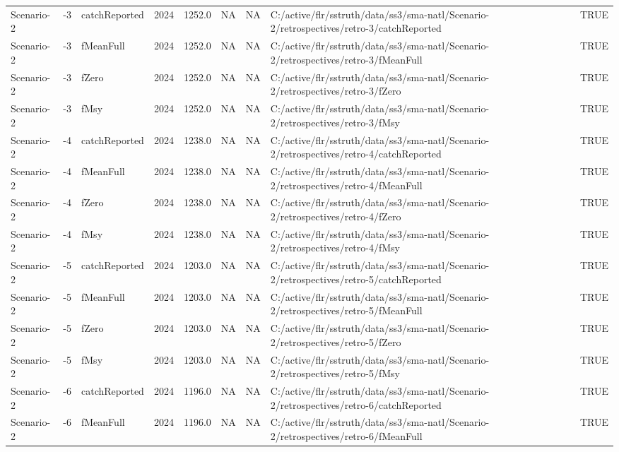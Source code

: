 \begin{table}
\begin{tabular}[t]{lllrrrrll}
Scenario-2 & -3 & catchReported & 2024 & 1252.0 & NA & NA & C:/active/flr/sstruth/data/ss3/sma-natl/Scenario-2/retrospectives/retro-3/catchReported & TRUE\\
Scenario-2 & -3 & fMeanFull & 2024 & 1252.0 & NA & NA & C:/active/flr/sstruth/data/ss3/sma-natl/Scenario-2/retrospectives/retro-3/fMeanFull & TRUE\\
Scenario-2 & -3 & fZero & 2024 & 1252.0 & NA & NA & C:/active/flr/sstruth/data/ss3/sma-natl/Scenario-2/retrospectives/retro-3/fZero & TRUE\\
\addlinespace
Scenario-2 & -3 & fMsy & 2024 & 1252.0 & NA & NA & C:/active/flr/sstruth/data/ss3/sma-natl/Scenario-2/retrospectives/retro-3/fMsy & TRUE\\
Scenario-2 & -4 & catchReported & 2024 & 1238.0 & NA & NA & C:/active/flr/sstruth/data/ss3/sma-natl/Scenario-2/retrospectives/retro-4/catchReported & TRUE\\
Scenario-2 & -4 & fMeanFull & 2024 & 1238.0 & NA & NA & C:/active/flr/sstruth/data/ss3/sma-natl/Scenario-2/retrospectives/retro-4/fMeanFull & TRUE\\
Scenario-2 & -4 & fZero & 2024 & 1238.0 & NA & NA & C:/active/flr/sstruth/data/ss3/sma-natl/Scenario-2/retrospectives/retro-4/fZero & TRUE\\
Scenario-2 & -4 & fMsy & 2024 & 1238.0 & NA & NA & C:/active/flr/sstruth/data/ss3/sma-natl/Scenario-2/retrospectives/retro-4/fMsy & TRUE\\
\addlinespace
Scenario-2 & -5 & catchReported & 2024 & 1203.0 & NA & NA & C:/active/flr/sstruth/data/ss3/sma-natl/Scenario-2/retrospectives/retro-5/catchReported & TRUE\\
Scenario-2 & -5 & fMeanFull & 2024 & 1203.0 & NA & NA & C:/active/flr/sstruth/data/ss3/sma-natl/Scenario-2/retrospectives/retro-5/fMeanFull & TRUE\\
Scenario-2 & -5 & fZero & 2024 & 1203.0 & NA & NA & C:/active/flr/sstruth/data/ss3/sma-natl/Scenario-2/retrospectives/retro-5/fZero & TRUE\\
Scenario-2 & -5 & fMsy & 2024 & 1203.0 & NA & NA & C:/active/flr/sstruth/data/ss3/sma-natl/Scenario-2/retrospectives/retro-5/fMsy & TRUE\\
Scenario-2 & -6 & catchReported & 2024 & 1196.0 & NA & NA & C:/active/flr/sstruth/data/ss3/sma-natl/Scenario-2/retrospectives/retro-6/catchReported & TRUE\\
\addlinespace
Scenario-2 & -6 & fMeanFull & 2024 & 1196.0 & NA & NA & C:/active/flr/sstruth/data/ss3/sma-natl/Scenario-2/retrospectives/retro-6/fMeanFull & TRUE\\

\end{tabular}
\end{table}
